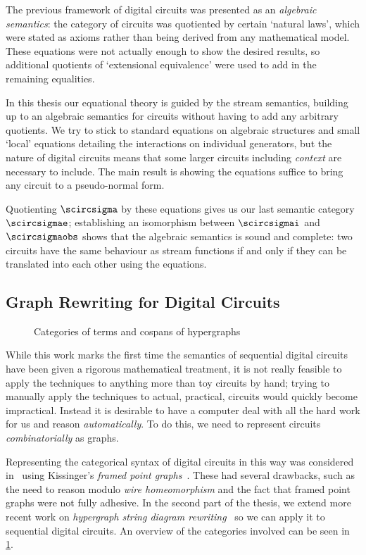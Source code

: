 The previous framework of digital circuits was presented as an
\emph{algebraic semantics}: the category of circuits was quotiented by certain
`natural laws', which were stated as axioms rather than being derived from any
mathematical model.
These equations were not actually enough to show the desired results, so
additional quotients of `extensional equivalence' were used to add in the
remaining equalities.

In this thesis our equational theory is guided by the stream semantics,
building up to an algebraic semantics for circuits without having to add any
arbitrary quotients.
We try to stick to standard equations on algebraic structures and small `local'
equations detailing the interactions on individual generators, but the nature of
digital circuits means that some larger circuits including \emph{context} are
necessary to include.
The main result is showing the equations suffice to bring any circuit to a
pseudo-normal form.

Quotienting \(\scircsigma\) by these equations gives us our last semantic
category \(\scircsigmae\); establishing an isomorphism between \(\scircsigmai\)
and \(\scircsigmaobs\) shows that the algebraic semantics is sound and complete:
two circuits have the same behaviour as stream functions if and only if they
can be translated into each other using the equations.

\subsection{Graph Rewriting for Digital Circuits}

\begin{figure}
    \centering
    
    \caption{Categories of terms and cospans of hypergraphs}
    \label{fig:hypergraphs-map}
\end{figure}

While this work marks the first time the semantics of sequential digital
circuits have been given a rigorous mathematical treatment, it is not really
feasible to apply the techniques to anything more than toy circuits by hand;
trying to manually apply the techniques to actual, practical, circuits would
quickly become impractical.
Instead it is desirable to have a computer deal with all the hard work
for us and reason \emph{automatically}.
To do this, we need to represent circuits \emph{combinatorially} as graphs.

Representing the categorical syntax of digital circuits in this way was
considered in~\cite{ghica2017diagrammatic} using
Kissinger's \emph{framed point graphs}~\cite{kissinger2012pictures}.
These had several drawbacks, such as the need to reason modulo
\emph{wire homeomorphism} and the fact that framed point graphs were not fully
adhesive.
In the second part of the thesis, we extend more recent work on
\emph{hypergraph string diagram rewriting}~\cite{bonchi2022string,bonchi2022stringa,bonchi2022stringb}
so we can apply it to sequential digital circuits.
An overview of the categories involved can be seen in
\cref{fig:hypergraphs-map}.

